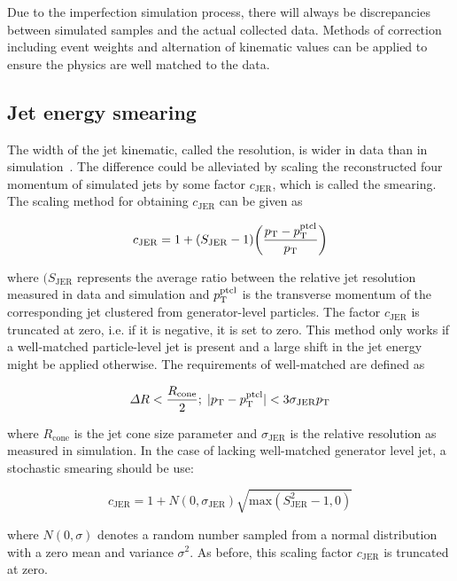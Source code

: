 Due to the imperfection simulation process, there will always be discrepancies between simulated samples and the actual collected data.
Methods of correction including event weights and alternation of kinematic values can be applied to ensure the physics are well matched to the data.

\subsection{Jet energy smearing}
The width of the jet kinematic, called the resolution, is wider in data than in simulation~\cite{CMS:2016lmd}.
The difference could be alleviated by scaling the reconstructed four momentum of simulated jets by some factor $c_{\mathrm{JER}}$, which is called the smearing.
The scaling method for obtaining $c_{\mathrm{JER}}$ can be given as
\begin{linenomath}\begin{equation}\label{eq:data_smear}
    c_{\mathrm{JER}} = 1 + (S_{\mathrm{JER}}-1)\biggl(\frac{p_{\mathrm{T}}-p_{\mathrm{T}}^{\mathrm{ptcl}}}{p_{\mathrm{T}}}\biggr)
\end{equation}\end{linenomath}
where $(S_{\mathrm{JER}}$ represents the average ratio between the relative jet resolution measured in data and simulation and $p_{\mathrm{T}}^{\mathrm{ptcl}}$ is the transverse momentum of the corresponding jet clustered from generator-level particles.
The factor $c_{\mathrm{JER}}$ is truncated at zero, i.e. if it is negative, it is set to zero. 
This method only works if a well-matched particle-level jet is present and a large shift in the jet energy might be applied otherwise.
The requirements of well-matched are defined as
\begin{linenomath}\begin{equation}\label{eq:data_wellmatched}
    \Delta R < \frac{R_{\mathrm{cone}}}{2};\; |p_{\mathrm{T}}-p_{\mathrm{T}}^{\mathrm{ptcl}}|<3\sigma_{\mathrm{JER}}p_{\mathrm{T}}
\end{equation}\end{linenomath}
where $R_{\mathrm{cone}}$ is the jet cone size parameter and $\sigma_{\mathrm{JER}}$ is the relative \PT resolution as measured in simulation.
In the case of lacking well-matched generator level jet, a stochastic smearing should be use:
\begin{linenomath}\begin{equation}\label{eq:data_stochastic}
    c_{\mathrm{JER}} = 1 + N(0, \sigma_{\mathrm{JER}}) \sqrt{\mathrm{max}(S_{\mathrm{JER}}^2-1,0)}
\end{equation}\end{linenomath}
where $N(0,\sigma)$ denotes a random number sampled from a normal distribution with a zero mean and variance $\sigma^2$.
As before, this scaling factor $c_{\mathrm{JER}}$ is truncated at zero.

